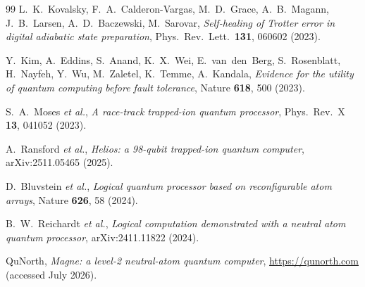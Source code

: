 \documentclass[
  aps,            %
  prc,            %
  reprint,        %
  superscriptaddress,
  floatfix,
  nofootinbib
]{revtex4-2}
\begin{document}
\begin{thebibliography}{99}
L.~K.~Kovalsky, F.~A.~Calderon-Vargas, M.~D.~Grace, A.~B.~Magann,
J.~B.~Larsen, A.~D.~Baczewski, M.~Sarovar,
\textit{Self-healing of Trotter error in digital adiabatic state preparation},
Phys.\ Rev.\ Lett.\ \textbf{131}, 060602 (2023).

Y.~Kim, A.~Eddins, S.~Anand, K.~X.~Wei, E.~van~den~Berg, S.~Rosenblatt,
H.~Nayfeh, Y.~Wu, M.~Zaletel, K.~Temme, A.~Kandala,
\textit{Evidence for the utility of quantum computing before fault tolerance},
Nature \textbf{618}, 500 (2023).

S.~A.~Moses \textit{et al.},
\textit{A race-track trapped-ion quantum processor},
Phys.\ Rev.\ X \textbf{13}, 041052 (2023).

A.~Ransford \textit{et al.},
\textit{Helios: a 98-qubit trapped-ion quantum computer},
arXiv:2511.05465 (2025).

D.~Bluvstein \textit{et al.},
\textit{Logical quantum processor based on reconfigurable atom arrays},
Nature \textbf{626}, 58 (2024).

B.~W.~Reichardt \textit{et al.},
\textit{Logical computation demonstrated with a neutral atom quantum processor},
arXiv:2411.11822 (2024).

QuNorth, \textit{Magne: a level-2 neutral-atom quantum computer},
\url{https://qunorth.com} (accessed July 2026).
\end{thebibliography}
\end{document}
